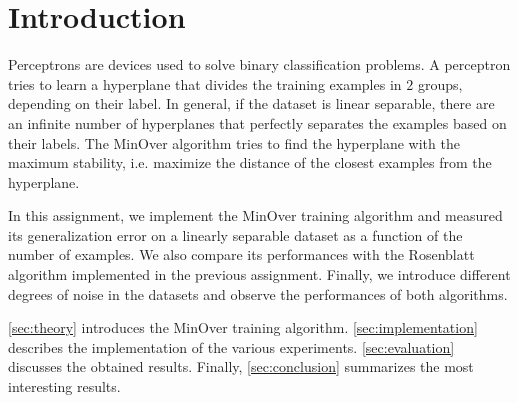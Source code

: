 \section{Introduction}
\label{sec:introduction}

Perceptrons are devices used to solve binary classification problems.
A perceptron tries to learn a hyperplane that divides the training examples in $2$ groups, depending on their label.
In general, if the dataset is linear separable, there are an infinite number of hyperplanes that perfectly separates the examples based on their labels.
The MinOver algorithm \cite{minover} tries to find the hyperplane with the maximum stability, i.e. maximize the distance of the closest examples from the hyperplane.

In this assignment, we implement the MinOver training algorithm and measured its generalization error on a linearly separable dataset as a function of the number of examples.
We also compare its performances with the Rosenblatt algorithm \cite{rosenblatt} implemented in the previous assignment.
Finally, we introduce different degrees of noise in the datasets and observe the performances of both algorithms.

\cref{sec:theory} introduces the MinOver training algorithm.
\cref{sec:implementation} describes the implementation of the various experiments.
\cref{sec:evaluation} discusses the obtained results.
Finally, \cref{sec:conclusion} summarizes the most interesting results.
